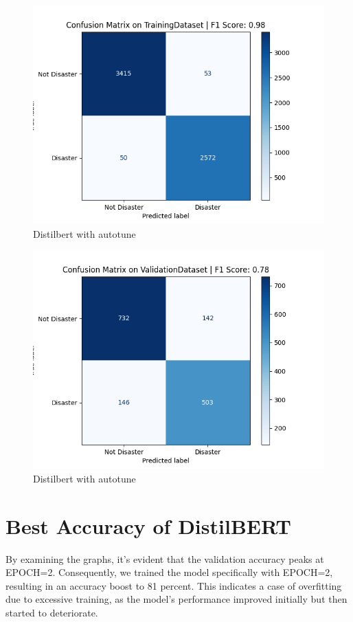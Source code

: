 \begin{figure}[H]
    \centering
    \includegraphics[scale=0.7]{figures/Distilbert_autotune_Training_confusion_matrix.png}
    \caption{Distilbert with autotune}
\end{figure}

\begin{figure}[H]
    \centering
    \includegraphics[scale=0.7]{figures/Distilbert_autotune_Validation_confusion_matrix.png}
    \caption{Distilbert with autotune}
\end{figure}


\newpage 
\section{Best Accuracy of DistilBERT}
By examining the graphs, it's evident that the validation accuracy peaks at EPOCH=2. Consequently, we trained the model specifically with EPOCH=2, resulting in an accuracy boost to 81 percent. This indicates a case of overfitting due to excessive training, as the model's performance improved initially but then started to deteriorate.

